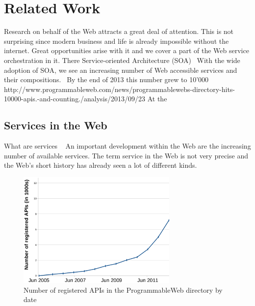 
\chapter{Related Work}

Research on behalf of the Web attracts a great deal of attention.
This is not surprising since modern business and life is already impossible without the internet.
Great opportunities arise with it and we cover a part of the Web service orchestration in it.
There 
Service-oriented Architecture (SOA)~\cite{perrey2003service}
With the wide adoption of SOA, we see an increasing number of Web accessible services and their compositions.~\cite{conf/icws/HuangFT12}
By the end of 2013 this number grew to 10'000 http://www.programmableweb.com/news/programmablewebs-directory-hits-10000-apis.-and-counting./analysis/2013/09/23
At the 
\section{Services in the Web}
What are services
~\cite{peltz2003web}
An important development within the Web are the increasing number of available services.
The term service in the Web is not very precise and the Web's short history has already seen a lot of different kinds.

\begin{figure}[!ht]
  \centering
  \includegraphics[width=0.7\textwidth]{figures/NumOfAPIs}
  \caption{Number of registered APIs in the ProgrammableWeb directory by date}
  \label{fig:NumOfAPIs}
\end{figure}


